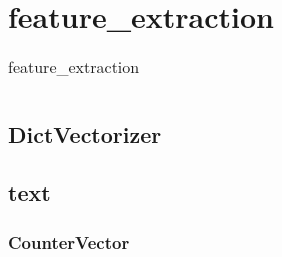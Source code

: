 \chapter{feature\_extraction}
\begin{table}
    \centering
    \caption{feature\_extraction}
    \begin{tabular}{ll}
        \hline
        \nameref{CounterVector} & \nameref{DictVectorizer} \\
        \hline
    \end{tabular}
\end{table}
\section{DictVectorizer\label{DictVectorizer}}
\section{text}
\subsection{CounterVector\label{CounterVector}}